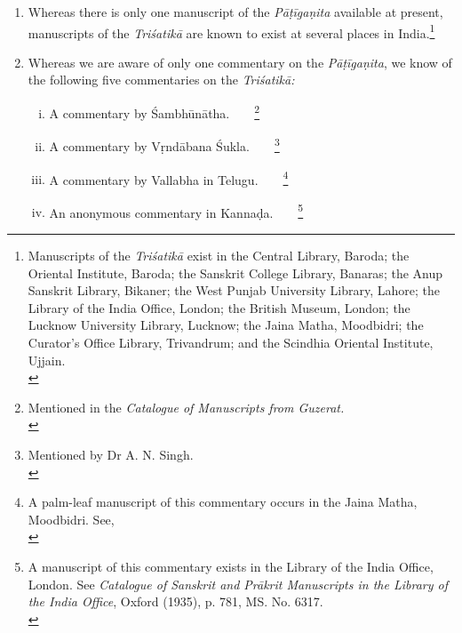 \documentclass[10pt, openany]{book}
\begin{document}
\begin{enumerate}
    \item {Whereas there is only one manuscript of the \textit{Pāṭīgaṇita}}
{available at present, manuscripts of the \textit{Triśatikā }are}
{known to exist at several places in India.}\renewcommand{\thefootnote}{1}\footnote{\hspace{-2mm} \englishfont Manuscripts of the \textit{Triśatikā} exist in the Central Library, Baroda; 
the Oriental Institute, Baroda; the Sanskrit College Library, Banaras;
the Anup Sanskrit Library, Bikaner; the West Punjab University Library,
Lahore; the Library of the India Office, London; the British Museum, 
London; the Lucknow University Library, Lucknow; the Jaina 
Matha, Moodbidri; the Curator's Office Library, Trivandrum; and the Scindhia 
Oriental Institute, Ujjain.\\}

\item{Whereas we are aware of only one commentary on} 
{the \textit{Pāṭīgaṇita}, we know of the following five}
{commentaries on the \textit{Triśatikā:}}

\begin{enumerate}[(i)]
    \item A commentary by Śambhūnātha.~~~~\renewcommand{\thefootnote}{\hspace{-4.5mm} 2}\footnote{\hspace{-2mm} \englishfont Mentioned in the \textit{Catalogue of Manuscripts from Guzerat.}\\}

    \item A commentary by Vṛndābana Śukla.~~~~\renewcommand{\thefootnote}{\hspace{-4.5mm} 3}\footnote{\hspace{-2mm} \englishfont Mentioned by Dr A. N. Singh.\\}

    \item A commentary by Vallabha in Telugu.~~~~\renewcommand{\thefootnote}{\hspace{-5mm} 4}\footnote{\hspace{-2mm} \englishfont A palm-leaf manuscript of this commentary occurs in the Jaina Matha, Moodbidri. See,\\}

    \item An anonymous commentary in Kannaḍa.~~~~\renewcommand{\thefootnote}{\hspace{-4.5mm} 5}\footnote{\hspace{-2mm} \englishfont A manuscript of this commentary exists in the Library of the India Office, London. See \textit{Catalogue of Sanskrit and Prākrit Manuscripts in the Library of the India Office}, Oxford (1935), p. 781, MS. No. 6317.\\}


\end{enumerate}
\end{enumerate}
\end{document}
